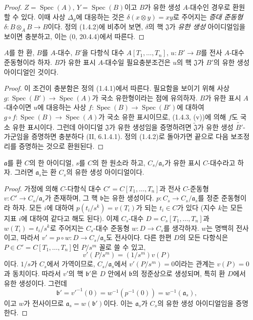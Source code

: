 
\begin{proof}
$Z=\operatorname{Spec}(A)$, $Y=\operatorname{Spec}(B)$이고 $B$가
유한 생성 $A$-대수인 경우로 환원할 수 있다. 이때 사상 $\Delta_g$에
대응하는 것은 $\delta(x\otimes y)=xy$로 주어지는
\emph{증대 준동형} $\delta:B\otimes_AB\to B$이다. 정의 (1.4.2)에
비추어 보면, $\delta$의 핵 $\mathfrak J$가 \emph{유한 생성}
아이디얼임을 보이면 충분하고, 이는 (0, 20.4.4)에서 따른다.
\end{proof}

\begin{proposition}[1.4.4]
\label{IV.1.4.4-fr}
$A$를 한 환, $B$를 $A$-대수, $B'$을 다항식 대수
$A[T_1,\ldots,T_n]$, $u:B'\to B$를 전사 $A$-대수 준동형이라
하자. $B$가 유한 표시 $A$-대수일 필요충분조건은 $u$의 핵
$\mathfrak J$가 $B'$의 유한 생성 아이디얼인 것이다.
\end{proposition}

\begin{proof}
이 조건이 충분함은 정의 (1.4.1)에서 따른다. 필요함을 보이기 위해
사상 $g:\operatorname{Spec}(B')\to\operatorname{Spec}(A)$가 국소
유한형이라는 점에 유의하자. $B$가 유한 표시 $A$-대수이면 $u$에
대응하는 사상 $f:\operatorname{Spec}(B)\to\operatorname{Spec}(B')$에
대하여 $g\circ f:\operatorname{Spec}(B)\to\operatorname{Spec}(A)$가
국소 유한 표시이므로, (1.4.3, (v))에 의해 $f$도 국소 유한 표시이다.
그런데 아이디얼 $\mathfrak J$가 유한 생성임을 증명하려면
$\widetilde{\mathfrak J}$가 유한 생성 $\widetilde{B'}$-가군임을
증명하면 충분하다 (II, 6.1.4.1). 정의 (1.4.2)로 돌아가면 끝으로
다음 보조정리를 증명하는 것으로 환원된다.
\end{proof}

\begin{lemma}[1.4.4.1]
\label{IV.1.4.4.1-fr}
$\mathfrak a$를 환 $C$의 한 아이디얼, $s$를 $C$의 한 원소라 하고,
$C_s/\mathfrak a_s$가 유한 표시 $C$-대수라고 하자. 그러면
$\mathfrak a_s$는 환 $C_s$의 유한 생성 아이디얼이다.
\end{lemma}

\begin{proof}
가정에 의해 $C$-다항식 대수 $C'=C[T_1,\ldots,T_n]$과 전사
$C$-준동형 $v:C'\to C_s/\mathfrak a_s$가 존재하며, 그 핵
$\mathfrak b$는 유한 생성이다. $p:C_s\to C_s/\mathfrak a_s$를
정준 준동형이라 하자. 모든 $i$에 대하여
$p(t_i/s^k)=v(T_i)$가 되는 $t_i\in C$가 있다 (지수 $k$는 모든
지표 $i$에 대하여 같다고 해도 된다). 이제 $C_s$-대수
$D=C_s[T_1,\ldots,T_n]$과 $w(T_i)=t_i/s^k$로 주어지는
$C_s$-대수 준동형 $w:D\to C_s$를 생각하자. $w$는 명백히 전사이고,
따라서 $v'=p\circ w:D\to C_s/\mathfrak a_s$도 전사이다. 다른 한편
$D$의 모든 다항식은 $P\in C'=C[T_1,\ldots,T_n]$인 $P/s^m$ 꼴로
쓸 수 있고,
\[
  v'(P/s^m)=(1/s^m)v(P)
\]
이다. $1/s$가 $C_s$에서 가역이므로, $C_s/\mathfrak a_s$에서
$v'(P/s^m)=0$이라는 관계는 $v(P)=0$과 동치이다. 따라서 $v'$의 핵
$\mathfrak b'$은 $D$ 안에서 $\mathfrak b$의 정준상으로 생성되며,
특히 환 $D$에서 유한 생성이다. 그런데
\[
  \mathfrak b'=v'^{-1}(0)=w^{-1}(p^{-1}(0))
  =w^{-1}(\mathfrak a_s),
\]
이고 $w$가 전사이므로 $\mathfrak a_s=w(\mathfrak b')$이다. 이는
$\mathfrak a_s$가 $C_s$의 유한 생성 아이디얼임을 증명한다.
\end{proof}

